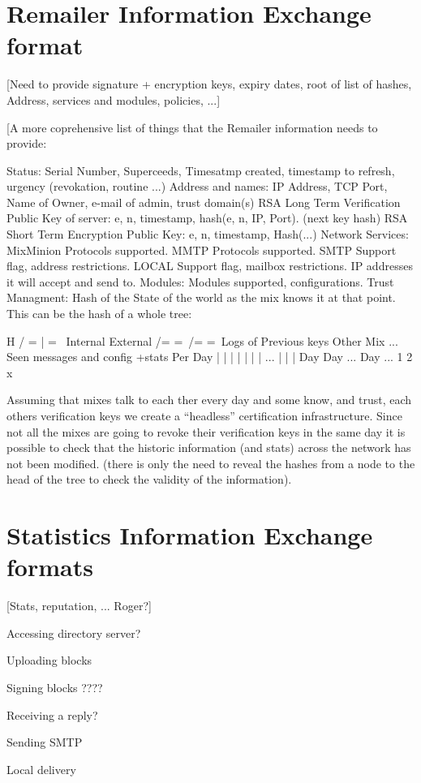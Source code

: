 \section{Remailer Information Exchange format}

[Need to provide signature + encryption keys, expiry dates, root of
list of hashes, Address, services and modules, policies, ...]

[A more coprehensive list of things that the Remailer information
needs to provide:

Status: Serial Number, Superceeds, Timesatmp created, timestamp to
        refresh, urgency (revokation, routine ...)	  
Address and names: IP Address, TCP Port, Name of Owner, e-mail of
                   admin, trust domain(s) 
RSA Long Term Verification Public Key of server: e, n, timestamp,
                   hash(e, n, IP, Port). (next key hash)
RSA Short Term Encryption Public Key: e, n, timestamp, Hash(...)
Network Services: MixMinion Protocols supported.
		  MMTP Protocols supported.
	          SMTP Support flag, address restrictions.
                  LOCAL Support flag, mailbox restrictions.
	          IP addresses it will accept and send to.
Modules: Modules supported, configurations.
Trust Managment: Hash of the State of the world as the mix knows it at
        that point. This can be the hash of a whole tree:

		           H
             / =           |                   = \
	Internal                               External
 /=                  =\                     /=        =\
Logs of           Previous keys          Other Mix    ...
Seen messages     and config +stats       Per Day
|   |    |   |    |   |   |  ...          |   |   |
Day Day ...  Day  ...
1   2        x


Assuming that mixes talk to each ther every day and some know, and
trust, each others verification keys we create a ``headless''
certification infrastructure. Since not all the mixes are going to
revoke their verification keys in the same day it is possible to 
check that the historic information (and stats) across the network has
not been modified. (there is only the need to reveal the hashes from a
node to the head of the tree to check the validity of the information).

\section{Statistics Information Exchange formats}

[Stats, reputation, ... Roger?]

Accessing directory server?

Uploading blocks

Signing blocks ????

Receiving a reply?

Sending SMTP

Local delivery

